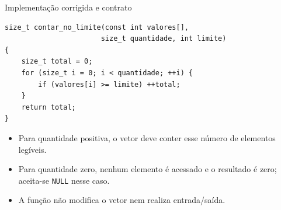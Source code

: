 \begin{frame}[fragile]{Implementação corrigida e contrato}
\begin{lstlisting}
size_t contar_no_limite(const int valores[],
                       size_t quantidade, int limite)
{
    size_t total = 0;
    for (size_t i = 0; i < quantidade; ++i) {
        if (valores[i] >= limite) ++total;
    }
    return total;
}
\end{lstlisting}
\begin{itemize}
\item Para quantidade positiva, o vetor deve conter esse número de elementos legíveis.
\item Para quantidade zero, nenhum elemento é acessado e o resultado é zero; aceita-se \texttt{NULL} nesse caso.
\item A função não modifica o vetor nem realiza entrada/saída.
\end{itemize}
\end{frame}
